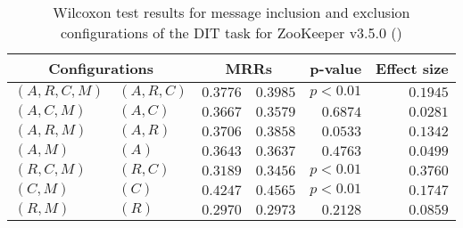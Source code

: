 
\begin{table}
\begin{spacing}{1.2}
\centering
\caption{Wilcoxon test results for message inclusion and exclusion configurations of the DIT task for ZooKeeper v3.5.0 (\ctwo)}
\label{table:versus-wilcox-zookeeper-dit-message}
\begin{tabular}{ll|rr|rr}
\toprule
      \multicolumn{2}{c|}{Configurations} &                \multicolumn{2}{c|}{MRRs} &             p-value & Effect size \\
\midrule
 $(A,R,C,M)$ &  $(A,R,C)$ &       $0.3776$ &  $\bm{0.3985}$ & $p<0.01$ &    $0.1945$ \\
   $(A,C,M)$ &    $(A,C)$ &  $\bm{0.3667}$ &       $0.3579$ & $0.6874$ &    $0.0281$ \\
   $(A,R,M)$ &    $(A,R)$ &       $0.3706$ &  $\bm{0.3858}$ & $0.0533$ &    $0.1342$ \\
     $(A,M)$ &      $(A)$ &  $\bm{0.3643}$ &       $0.3637$ & $0.4763$ &    $0.0499$ \\
   $(R,C,M)$ &    $(R,C)$ &       $0.3189$ &  $\bm{0.3456}$ & $p<0.01$ &    $0.3760$ \\
     $(C,M)$ &      $(C)$ &       $0.4247$ &  $\bm{0.4565}$ & $p<0.01$ &    $0.1747$ \\
     $(R,M)$ &      $(R)$ &       $0.2970$ &  $\bm{0.2973}$ & $0.2128$ &    $0.0859$ \\
\bottomrule
\end{tabular}

\end{spacing}
\end{table}

